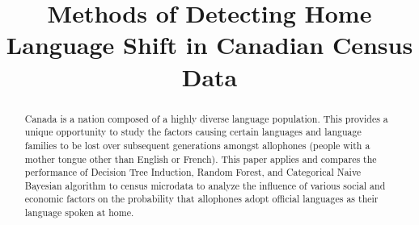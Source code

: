 \documentclass[10pt, conference, compsocconf]{IEEEtran}
\begin{document}
%
\title{Methods of Detecting Home Language Shift in Canadian Census Data}



\author{
}


% 








\maketitle


\begin{abstract}
Canada is a nation composed of a highly diverse language population. This provides a unique opportunity to study the factors causing certain languages and language families to be lost over subsequent generations amongst allophones (people with a mother tongue other than English or French). This paper applies and compares the performance of Decision Tree Induction, Random Forest, and Categorical Naive Bayesian algorithm to census microdata to analyze the influence of various social and economic factors on the probability that allophones adopt official languages as their language spoken at home.

\end{abstract}
\end{document}
